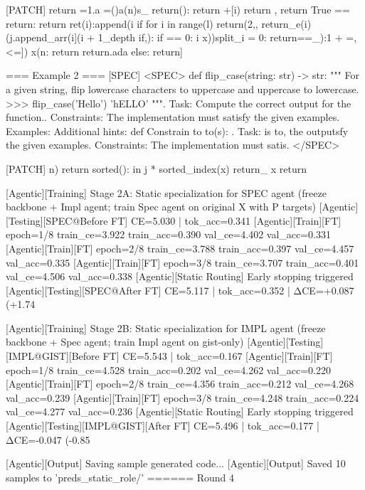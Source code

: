 [PATCH]
return =1.a =()a(n)s_ return(): return +[i) return , return True == return: return ret(i):append(i if for i in range(l) return(2,, return_e(i)(j.append_arr(i](i + 1_depth if,): if == 0: i x))split_i = 0: return==_):1 + =, <=]) x(n: return return.ada else: return]

=== Example 2 ===
[SPEC]
<SPEC> def flip_case(string: str) -> str: """ For a given string, flip lowercase characters to uppercase and uppercase to lowercase. >>> flip_case('Hello') 'hELLO' """. Task: Compute the correct output for the function.. Constraints: The implementation must satisfy the given examples. Examples: Additional hints: def Constrain to to(s): . Task: is to, the outputsfy the given examples. Constraints: The implementation must satis. </SPEC>

[PATCH]
n) return sorted(): in j * sorted_index(x) return_ x return %

[Agentic][Training] Stage 2A: Static specialization for SPEC agent (freeze backbone + Impl agent; train Spec agent on original X with P targets)
[Agentic][Testing][SPEC@Before FT] CE=5.030 | tok_acc=0.341
[Agentic][Train][FT] epoch=1/8 train_ce=3.922 train_acc=0.390 val_ce=4.402 val_acc=0.331
[Agentic][Train][FT] epoch=2/8 train_ce=3.788 train_acc=0.397 val_ce=4.457 val_acc=0.335
[Agentic][Train][FT] epoch=3/8 train_ce=3.707 train_acc=0.401 val_ce=4.506 val_acc=0.338
[Agentic][Static Routing] Early stopping triggered
[Agentic][Testing][SPEC@After FT] CE=5.117 | tok_acc=0.352 | ΔCE=+0.087 (+1.74%

[Agentic][Training] Stage 2B: Static specialization for IMPL agent (freeze backbone + Spec agent; train Impl agent on gist-only)
[Agentic][Testing][IMPL@GIST][Before FT] CE=5.543 | tok_acc=0.167
[Agentic][Train][FT] epoch=1/8 train_ce=4.528 train_acc=0.202 val_ce=4.262 val_acc=0.220
[Agentic][Train][FT] epoch=2/8 train_ce=4.356 train_acc=0.212 val_ce=4.268 val_acc=0.239
[Agentic][Train][FT] epoch=3/8 train_ce=4.248 train_acc=0.224 val_ce=4.277 val_acc=0.236
[Agentic][Static Routing] Early stopping triggered
[Agentic][Testing][IMPL@GIST][After FT] CE=5.496 | tok_acc=0.177 | ΔCE=-0.047 (-0.85%

[Agentic][Output] Saving sample generated code...
[Agentic][Output] Saved 10 samples to 'preds_static_role/'
======
Round 4


